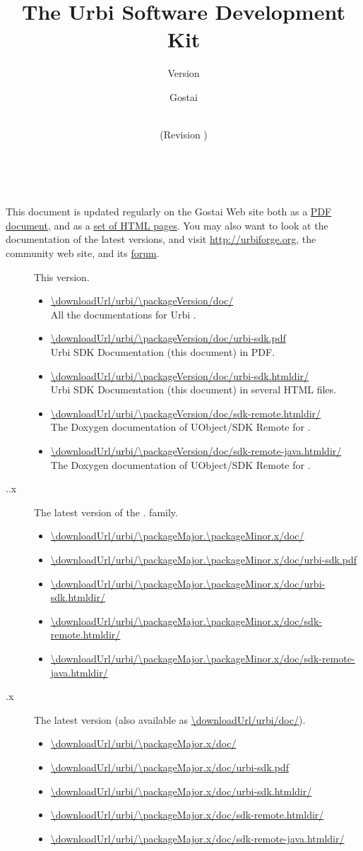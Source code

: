\documentclass[openright,twoside,11pt,final]{book}
\title{The Urbi Software Development Kit}
\subtitle{Version \packageVersion}
\date{\VcsDay\\(Revision \VcsDescription)}
\author{Gostai}
\begin{document}
\maketitle

\cleardoublepage
{
  ~

  \vfill
  \small

  This document is updated regularly on the Gostai Web site both as a
  \href{\docurl/urbi-sdk.pdf}{PDF document}, and as a
  \href{\docurl/urbi-sdk.htmldir/}{set of HTML pages}.  You may also want to
  look at the documentation of the latest versions, and visit
  \url{http://urbiforge.org}, the \urbi community web site, and its
  \href{http://forum.urbiforge.org}{forum}.

  \newcommand{\docItem}[2]{\item \url{#1} \\ #2.}
  \newcommand{\versionItem}[2]
  {
  \item[\packageName{} #1] #2.

    \begin{itemize}
      \docItem{\downloadUrl/urbi/#1/doc/}
      {All the documentations for Urbi #1}
      \docItem{\downloadUrl/urbi/#1/doc/urbi-sdk.pdf}
      {Urbi SDK Documentation (this document) in PDF}
      \docItem{\downloadUrl/urbi/#1/doc/urbi-sdk.htmldir/}
      {Urbi SDK Documentation (this document) in several HTML files}
      \docItem{\downloadUrl/urbi/#1/doc/sdk-remote.htmldir/}
      {The Doxygen documentation of UObject/SDK Remote for \Cxx}
      \docItem{\downloadUrl/urbi/#1/doc/sdk-remote-java.htmldir/}%
      {The Doxygen documentation of UObject/SDK Remote for \Java}
    \end{itemize}
  }

  \begin{description}
    \versionItem{\packageVersion}{This version}
    \renewcommand{\docItem}[2]{\item \url{#1}}
    \versionItem{\packageMajor.\packageMinor.x}{The latest version of the
      \packageMajor.\packageMinor{} family}
    \versionItem{\packageMajor.x}{The latest version (also available as
      \url{\downloadUrl/urbi/doc/})}
  \end{description}
}



\tableofcontents







{
  
}

\end{document}
